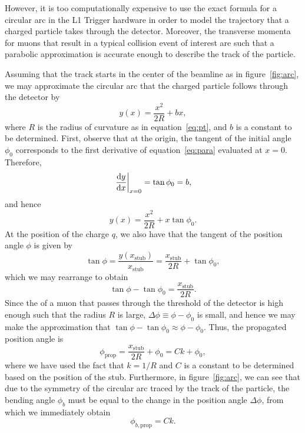 However, it is too computationally expensive to use the exact formula for a circular arc in the L1 Trigger hardware in order to model the trajectory that a charged particle takes through the detector.
Moreover, the transverse momenta for muons that result in a typical collision event of interest are such that a parabolic approximation is accurate enough to describe the track of the particle.

Assuming that the track starts in the center of the beamline as in figure~\ref{fig:arc}, we may approximate the circular arc that the charged particle follows through the detector by
\begin{equation}\label{eq:para}
  y(x)=\frac{x^2}{2R}+bx,
\end{equation}
where $R$ is the radius of curvature as in equation~\ref{eq:pt}, and $b$ is a constant to be determined.
First, observe that at the origin, the tangent of the initial angle $\phi_0$ corresponds to the first derivative of equation~\ref{eq:para} evaluated at $x=0$.
Therefore,
\begin{equation}
  \eval{\dv{y}{x}}_{x=0}=\tan\phi_0=b,
\end{equation}
and hence
\begin{equation}
  y(x)=\frac{x^2}{2R}+x\tan\phi_0.
\end{equation}
At the position of the charge $q$, we also have that the tangent of the position angle $\phi$ is given by
\begin{equation}
  \tan\phi=\frac{y(x_\mathrm{stub})}{x_\mathrm{stub}}=\frac{x_\mathrm{stub}}{2R}+\tan\phi_0,
\end{equation}
which we may rearrange to obtain
\begin{equation}
  \tan\phi-\tan\phi_0=\frac{x_\mathrm{stub}}{2R}.
\end{equation}
Since the \pt of a muon that passes through the threshold of the detector is high enough such that the radius $R$ is large, $\Delta\phi\equiv\phi-\phi_0$ is small, and hence we may make the approximation that $\tan\phi-\tan\phi_0\approx\phi-\phi_0$.
Thus, the propagated position angle is
\begin{equation}\label{eq:phi}
  \phi_\mathrm{prop}=\frac{x_\mathrm{stub}}{2R}+\phi_0=Ck+\phi_0,
\end{equation}
where we have used the fact that $k=1/R$ and $C$ is a constant to be determined based on the position of the stub.
Furthermore, in figure~\ref{fig:arc}, we can see that due to the symmetry of the circular arc traced by the track of the particle, the bending angle $\phi_b$ must be equal to the change in the position angle $\Delta\phi$, from which we immediately obtain
\begin{equation}\label{eq:phib}
  \phi_{b,\mathrm{prop}}=Ck.
\end{equation}

